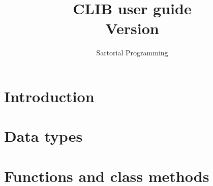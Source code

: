 \documentclass[a4paper] {report}
\author{Sartorial Programming}
\title{CLIB user guide \\ Version \clibVersionNumber{}}
\begin{document}
\maketitle
\tableofcontents

\newpage
\chapter{Introduction}



\chapter{Data types}


\chapter{Functions and class methods}

\end{document}
